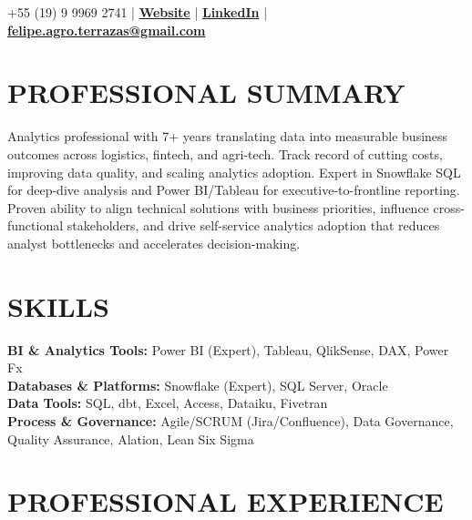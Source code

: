 \documentclass[9pt, letterpaper]{article}
\begin{document}
	\pagestyle{empty}

	 \hfill +55 (19) 9 9969 2741 | \href{https://feliperamiresterrazas.github.io/professionalwebsite/}{\textbf{Website}} | \href{https://www.linkedin.com/in/felipe-ramires-terrazas/}{\textbf{LinkedIn}} |
	\\
	 \hfill \href{mailto:felipe.agro.terrazas@gmail.com}{\textbf{felipe.agro.terrazas@gmail.com}}

	\section*{PROFESSIONAL SUMMARY}
	\noindent Analytics professional with 7+ years translating data into measurable business outcomes across logistics, fintech, and agri-tech. Track record of cutting costs, improving data quality, and scaling analytics adoption. Expert in Snowflake SQL for deep-dive analysis and Power BI/Tableau for executive-to-frontline reporting. Proven ability to align technical solutions with business priorities, influence cross-functional stakeholders, and drive self-service analytics adoption that reduces analyst bottlenecks and accelerates decision-making.

	\section*{SKILLS}
	\noindent \textbf{BI \& Analytics Tools:} Power BI (Expert), Tableau, QlikSense, DAX, Power Fx \\
	\noindent \textbf{Databases \& Platforms:} Snowflake (Expert), SQL Server, Oracle \\
	\noindent \textbf{Data Tools:} SQL, dbt, Excel, Access, Dataiku, Fivetran \\
	\noindent \textbf{Process \& Governance:} Agile/SCRUM (Jira/Confluence), Data Governance, Quality Assurance, Alation, Lean Six Sigma

	\section*{PROFESSIONAL EXPERIENCE}
\end{document}
